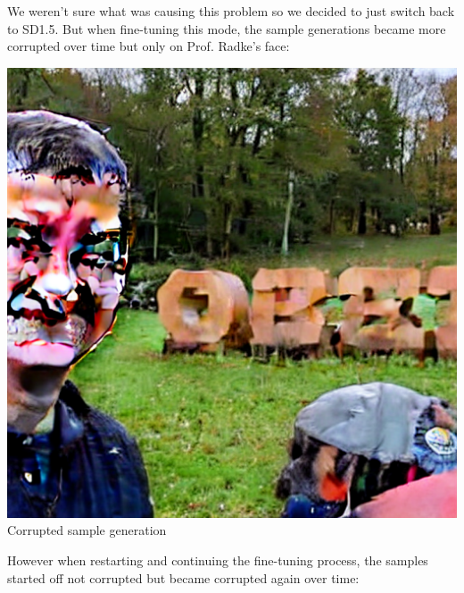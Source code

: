 \documentclass{article}
\begin{document}
We weren't sure what was causing this problem so we decided to just switch back to SD1.5. But when fine-tuning this mode, the sample generations became more corrupted over time but only on Prof. Radke's face:
\begin{center}
    \includegraphics[scale=0.2]{.imgs/radke_lora_v1.5_(1)_3400.png} \\
    Corrupted sample generation
\end{center}
However when restarting and continuing the fine-tuning process, the samples started off not corrupted but became corrupted again over time:
\end{document}
